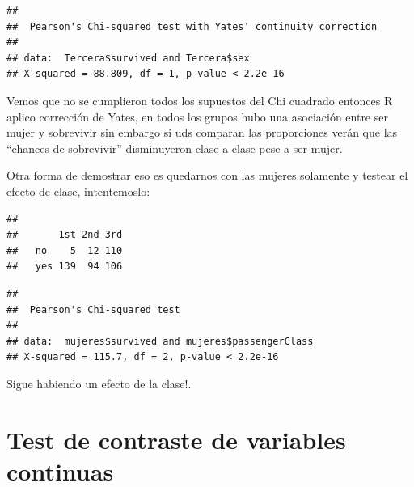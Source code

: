 \documentclass[
]{book}
\newenvironment{Shaded}{\begin{snugshade}}{\end{snugshade}}
\newcommand{\CommentTok}[1]{\textcolor[rgb]{0.56,0.35,0.01}{\textit{#1}}}
\newcommand{\FunctionTok}[1]{\textcolor[rgb]{0.00,0.00,0.00}{#1}}
\newcommand{\NormalTok}[1]{#1}
\newcommand{\OtherTok}[1]{\textcolor[rgb]{0.56,0.35,0.01}{#1}}
\newcommand{\SpecialCharTok}[1]{\textcolor[rgb]{0.00,0.00,0.00}{#1}}
\newcommand{\StringTok}[1]{\textcolor[rgb]{0.31,0.60,0.02}{#1}}
\begin{document}
\begin{verbatim}
## 
##  Pearson's Chi-squared test with Yates' continuity correction
## 
## data:  Tercera$survived and Tercera$sex
## X-squared = 88.809, df = 1, p-value < 2.2e-16
\end{verbatim}

Vemos que no se cumplieron todos los supuestos del Chi cuadrado entonces R aplico corrección de Yates, en todos los grupos hubo una asociación entre ser mujer y sobrevivir sin embargo si uds comparan las proporciones verán que las ``chances de sobrevivir'' disminuyeron clase a clase pese a ser mujer.

Otra forma de demostrar eso es quedarnos con las mujeres solamente y testear el efecto de clase, intentemoslo:

\begin{Shaded}
\end{Shaded}

\begin{verbatim}
##      
##       1st 2nd 3rd
##   no    5  12 110
##   yes 139  94 106
\end{verbatim}

\begin{Shaded}
\end{Shaded}

\begin{verbatim}
## 
##  Pearson's Chi-squared test
## 
## data:  mujeres$survived and mujeres$passengerClass
## X-squared = 115.7, df = 2, p-value < 2.2e-16
\end{verbatim}

Sigue habiendo un efecto de la clase!.

\hypertarget{test-de-contraste-de-variables-continuas}{%
\chapter{Test de contraste de variables continuas}\label{test-de-contraste-de-variables-continuas}}
\end{document}
